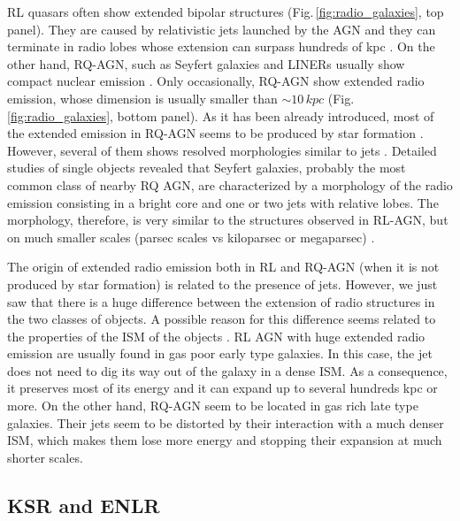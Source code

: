 \documentclass[../thesis.tex]{subfiles}
\begin{document}
RL quasars often show extended bipolar structures (Fig.\,\ref{fig:radio_galaxies}, top panel).
They are caused by relativistic jets launched by the AGN and they can terminate in radio lobes whose extension can surpass hundreds of kpc \citep[e.g][]{Fanaroff74,Perley79,Bridle94}.
On the other hand, RQ-AGN, such as Seyfert galaxies and LINERs usually show compact nuclear emission \citep{Singh15}.
Only occasionally, RQ-AGN show extended radio emission, whose dimension is usually smaller than $\sim 10\,\si{kpc}$ (Fig.\,\ref{fig:radio_galaxies}, bottom panel).
As it has been already introduced, most of the extended emission in RQ-AGN seems to be produced by star formation \citep{Baum93, Kellermann16}.
However, several of them shows resolved morphologies similar to jets \citep{Baum93,Colbert96,Morganti99,Gallimore06,Singh15, Singh15b}.
Detailed studies of single objects revealed that Seyfert galaxies, probably the most common class of nearby RQ AGN, are characterized by a morphology of the radio emission consisting in a bright core and one or two jets with relative lobes.
The morphology, therefore, is very similar to the structures observed in RL-AGN, but on much smaller scales (parsec scales vs kiloparsec or megaparsec) \citep[e.g.][]{Wrobel84,Ulvestad87,Morganti99,Kukula99,Momjian03,Kharb06}.

The origin of extended radio emission both in RL and RQ-AGN (when it is not produced by star formation) is related to the presence of jets.
However, we just saw that there is a huge difference between the extension of radio structures in the two classes of objects.
A possible reason for this difference seems related to the properties of the ISM of the objects \citep{Whittle04,Gallimore06,Schawinski11,Singh15b}.
RL AGN with huge extended radio emission are usually found in gas poor early type galaxies.
In this case, the jet does not need to dig its way out of the galaxy in a dense ISM.
As a consequence, it preserves most of its energy and it can expand up to several hundreds kpc or more.
On the other hand, RQ-AGN seem to be located in gas rich late type galaxies.
Their jets seem to be distorted by their interaction with a much denser ISM, which makes them lose more energy and stopping their expansion at much shorter scales.

\subsection{KSR and ENLR}
\end{document}
